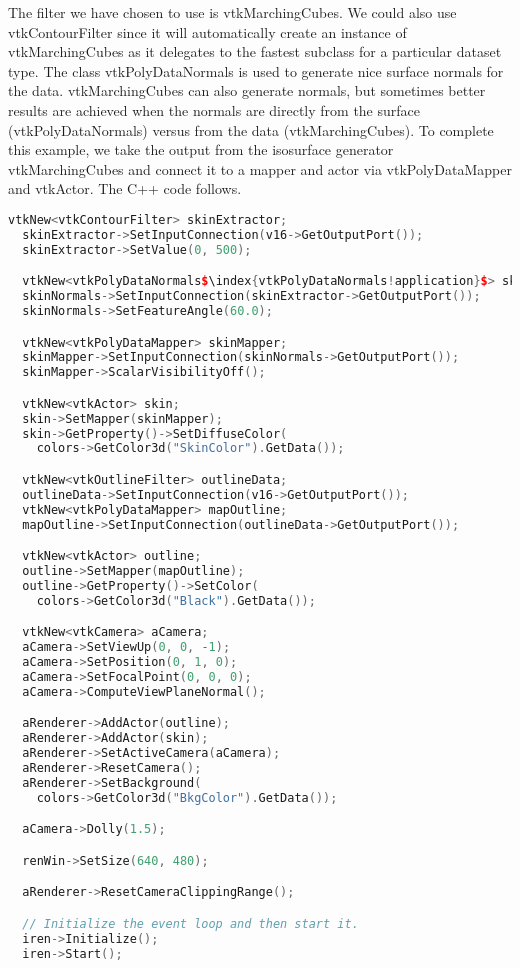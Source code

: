 The filter we have chosen to use is vtkMarchingCubes. We could also use vtkContourFilter since it will automatically create an instance of vtkMarchingCubes as it delegates to the fastest subclass for a particular dataset type. The class vtkPolyDataNormals is used to generate nice surface normals for the data. vtkMarchingCubes can also generate normals, but sometimes better results are achieved when the normals are directly from the surface (vtkPolyDataNormals) versus from the data (vtkMarchingCubes). To complete this example, we take the output from the isosurface generator vtkMarchingCubes and connect it to a mapper and actor via
vtkPolyDataMapper and vtkActor. The C++ code follows.

\begin{lstlisting}[language=C++, caption={Creating an isosurface.}, escapechar=\$]
  vtkNew<vtkContourFilter> skinExtractor;
  skinExtractor->SetInputConnection(v16->GetOutputPort());
  skinExtractor->SetValue(0, 500);

  vtkNew<vtkPolyDataNormals$\index{vtkPolyDataNormals!application}$> skinNormals;
  skinNormals->SetInputConnection(skinExtractor->GetOutputPort());
  skinNormals->SetFeatureAngle(60.0);

  vtkNew<vtkPolyDataMapper> skinMapper;
  skinMapper->SetInputConnection(skinNormals->GetOutputPort());
  skinMapper->ScalarVisibilityOff();

  vtkNew<vtkActor> skin;
  skin->SetMapper(skinMapper);
  skin->GetProperty()->SetDiffuseColor(
    colors->GetColor3d("SkinColor").GetData());

  vtkNew<vtkOutlineFilter> outlineData;
  outlineData->SetInputConnection(v16->GetOutputPort());
  vtkNew<vtkPolyDataMapper> mapOutline;
  mapOutline->SetInputConnection(outlineData->GetOutputPort());

  vtkNew<vtkActor> outline;
  outline->SetMapper(mapOutline);
  outline->GetProperty()->SetColor(
    colors->GetColor3d("Black").GetData());

  vtkNew<vtkCamera> aCamera;
  aCamera->SetViewUp(0, 0, -1);
  aCamera->SetPosition(0, 1, 0);
  aCamera->SetFocalPoint(0, 0, 0);
  aCamera->ComputeViewPlaneNormal();

  aRenderer->AddActor(outline);
  aRenderer->AddActor(skin);
  aRenderer->SetActiveCamera(aCamera);
  aRenderer->ResetCamera();
  aRenderer->SetBackground(
    colors->GetColor3d("BkgColor").GetData());

  aCamera->Dolly(1.5);

  renWin->SetSize(640, 480);

  aRenderer->ResetCameraClippingRange();

  // Initialize the event loop and then start it.
  iren->Initialize();
  iren->Start();
\end{lstlisting}

